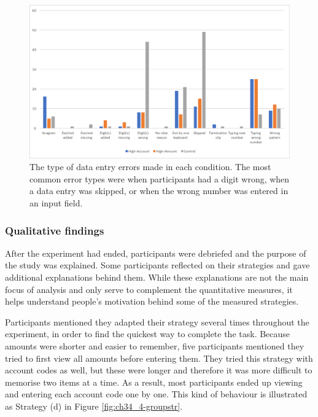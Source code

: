 
\begin{figure}
\includegraphics[width=\textwidth]{images/ch34/ch34-4_TypeofErrors.pdf}
    \caption{The type of data entry errors made in each condition. The most common error types were when participants had a digit wrong, when a data entry was skipped, or when the wrong number was entered in an input field.}\label{fig:ch34_4-typeoferrors}
\end{figure}

\subsubsection{Qualitative findings}
After the experiment had ended, participants were debriefed and the purpose of the study was explained. Some participants reflected on their strategies and gave additional explanations behind them. While these explanations are not the main focus of analysis and only serve to complement the quantitative measures, it helps understand people's motivation behind some of the measured strategies.

Participants mentioned they adapted their strategy several times throughout the experiment, in order to find the quickest way to complete the task. Because amounts were shorter and easier to remember, five participants mentioned they tried to first view all amounts before entering them. They tried this strategy with account codes as well, but these were longer and therefore it was more difficult to memorise two items at a time. As a result, most participants ended up viewing and entering each account code one by one. This kind of behaviour is illustrated as Strategy (d) in Figure \ref{fig:ch34_4-groupstr}.

